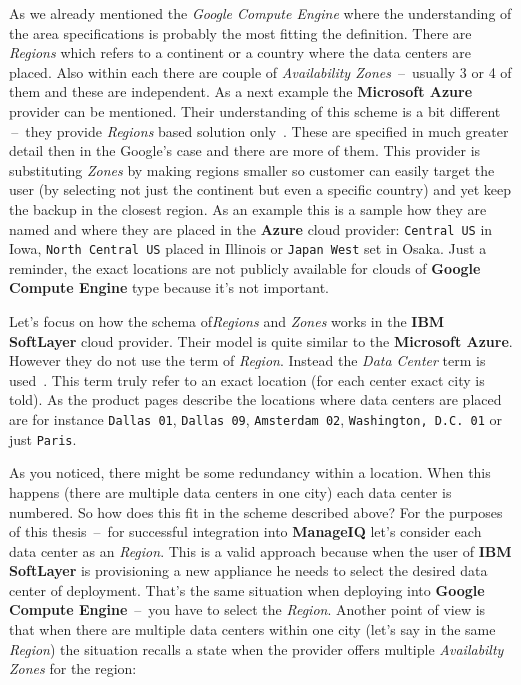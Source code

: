 As we already mentioned the \emph{Google Compute Engine} where the understanding of the area specifications is probably the most fitting the definition. There are \emph{Regions} which refers to a continent or a country where the data centers are placed. Also within each there are couple of \emph{Availability Zones} \,--\, usually 3 or 4 of them and these are independent. As a next example the \textbf{Microsoft Azure} provider can be mentioned. Their understanding of this scheme is a bit different \,--\, they provide \emph{Regions} based solution only~\cite{azure}. These are specified in much greater detail then in the Google's case and there are more of them. This provider is substituting \emph{Zones} by making regions smaller so customer can easily target the user (by selecting not just the continent but even a specific country) and yet keep the backup in the closest region. As an example this is a sample how they are named and where they are placed in the \textbf{Azure} cloud provider: \texttt{Central US} in Iowa, \texttt{North Central US} placed in Illinois or \texttt{Japan West} set in Osaka. Just a reminder, the exact locations are not publicly available for clouds of \textbf{Google Compute Engine} type because it's not important.

Let's focus on how the schema of\emph{Regions} and \emph{Zones} works in the \textbf{IBM SoftLayer} cloud provider. Their model is quite similar to the \textbf{Microsoft Azure}. However they do not use the term of \emph{Region}. Instead the \emph{Data Center} term is used~\cite{softlayer_datacenters}. This term truly refer to an exact location (for each center exact city is told). As the product pages describe the locations where data centers are placed are for instance \texttt{Dallas 01}, \texttt{Dallas 09}, \texttt{Amsterdam 02}, \texttt{Washington, D.C. 01} or just \texttt{Paris}.

As you noticed, there might be some redundancy within a location. When this happens (there are multiple data centers in one city) each data center is numbered. So how does this fit in the scheme described above? For the purposes of this thesis \,--\, for successful integration into \textbf{ManageIQ} let's consider each data center as an \emph{Region}. This is a valid approach because when the user of \textbf{IBM SoftLayer} is provisioning a new appliance he needs to select the desired data center of deployment. That's the same situation when deploying into \textbf{Google Compute Engine} \,--\, you have to select the \emph{Region}. Another point of view is that when there are multiple data centers within one city (let's say in the same \emph{Region}) the situation recalls a state when the provider offers multiple \emph{Availabilty Zones} for the region:

